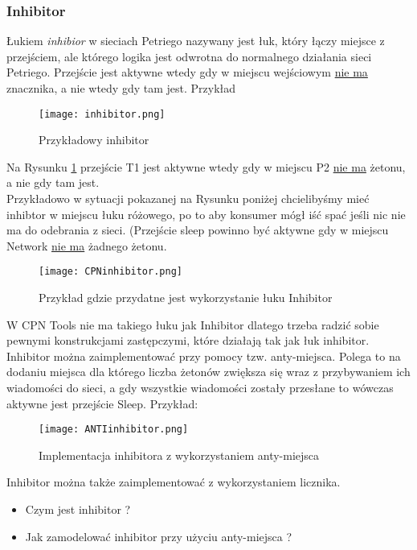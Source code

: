 \documentclass[a4paper,15pt]{article}
\begin{document}
\subsubsection{Inhibitor}
Łukiem \textit{inhibior} w sieciach Petriego nazywany jest łuk, który łączy miejsce z przejściem, ale którego logika jest odwrotna do normalnego działania sieci Petriego. Przejście jest aktywne wtedy gdy w miejscu wejściowym \underline{nie ma} znacznika, a nie wtedy gdy tam jest. Przykład
\begin{figure}[H]
\centerline{\texttt{[image: inhibitor.png]}}
\caption{Przykładowy inhibitor}
\label{fig:inhibitor}
\end{figure}
Na Rysunku \ref{fig:inhibitor} przejście T1 jest aktywne wtedy gdy w miejscu P2 \underline{nie ma} żetonu, a nie gdy tam jest. \\
Przykładowo w sytuacji pokazanej na Rysunku poniżej chcielibyśmy mieć inhibtor w miejscu łuku różowego, po to aby konsumer mógł iść spać jeśli nic nie ma do odebrania z sieci. (Przejście sleep powinno być aktywne gdy w miejscu Network \underline{nie ma} żadnego żetonu.
\begin{figure}[H]
\centerline{\texttt{[image: CPNinhibitor.png]}}
\caption{Przykład gdzie przydatne jest wykorzystanie łuku Inhibitor}
\label{fig:CPNinhibitor}
\end{figure}
W CPN Tools nie ma takiego łuku jak Inhibitor dlatego trzeba radzić sobie pewnymi konstrukcjami zastępczymi, które działają tak jak łuk inhibitor. \\
Inhibitor można zaimplementować przy pomocy tzw. anty-miejsca. Polega to na dodaniu miejsca dla którego liczba żetonów zwiększa się wraz z przybywaniem ich wiadomości do sieci, a gdy wszystkie wiadomości zostały przesłane to wówczas aktywne jest przejście Sleep. Przykład:
\begin{figure}[H]
\centerline{\texttt{[image: ANTIinhibitor.png]}}
\caption{Implementacja inhibitora z wykorzystaniem anty-miejsca}
\label{fig:ANTIinhibitor}
\end{figure}

Inhibitor można także zaimplementować z wykorzystaniem licznika.

\begin{framed}
\begin{itemize}
\item Czym jest inhibitor ?
\item Jak zamodelować inhibitor przy użyciu anty-miejsca ?
\end{itemize}
\end{framed}
\end{document}

